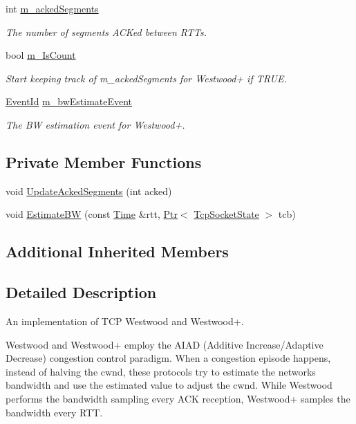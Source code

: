 \begin{DoxyCompactItemize}
int \hyperlink{classns3_1_1TcpWestwood_aae8e5f41c21569ddec32cc13a81cb62f}{m\+\_\+acked\+Segments}
\begin{DoxyCompactList}\small\item\em The number of segments A\+C\+Ked between R\+T\+Ts. \end{DoxyCompactList}\item 
bool \hyperlink{classns3_1_1TcpWestwood_a453644ea26b8f0d95234f9f1a1a25573}{m\+\_\+\+Is\+Count}
\begin{DoxyCompactList}\small\item\em Start keeping track of m\+\_\+acked\+Segments for Westwood+ if T\+R\+UE. \end{DoxyCompactList}\item 
\hyperlink{classns3_1_1EventId}{Event\+Id} \hyperlink{classns3_1_1TcpWestwood_aefc4b47ae1fd365e4b6777f80bfeca5c}{m\+\_\+bw\+Estimate\+Event}
\begin{DoxyCompactList}\small\item\em The BW estimation event for Westwood+. \end{DoxyCompactList}\end{DoxyCompactItemize}
\subsection*{Private Member Functions}
\begin{DoxyCompactItemize}
\item 
void \hyperlink{classns3_1_1TcpWestwood_a3470f4fdc611bd2bc3d2eb50613eac58}{Update\+Acked\+Segments} (int acked)
\item 
void \hyperlink{classns3_1_1TcpWestwood_a5c1377a1cca6cfc1c653e3591fd145ea}{Estimate\+BW} (const \hyperlink{classns3_1_1Time}{Time} \&rtt, \hyperlink{classns3_1_1Ptr}{Ptr}$<$ \hyperlink{classns3_1_1TcpSocketState}{Tcp\+Socket\+State} $>$ tcb)
\end{DoxyCompactItemize}
\subsection*{Additional Inherited Members}


\subsection{Detailed Description}
An implementation of T\+CP Westwood and Westwood+. 

Westwood and Westwood+ employ the A\+I\+AD (Additive Increase/\+Adaptive Decrease) congestion control paradigm. When a congestion episode happens, instead of halving the cwnd, these protocols try to estimate the network\textquotesingle{}s bandwidth and use the estimated value to adjust the cwnd. While Westwood performs the bandwidth sampling every A\+CK reception, Westwood+ samples the bandwidth every R\+TT.

